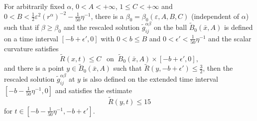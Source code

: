 \begin{lemma}
  \label{lem:cz-low-curvature-point-backward-extension}
For arbitrarily fixed $\alpha$,
$0<A<+\infty$, $1 \leq C<+\infty$ and $0 < B
<\frac{1}{2}\varepsilon^2 (r^{\alpha})^{-2}-
\frac{1}{50}\eta^{-1}$, there is a $\beta_0=\beta_0(\varepsilon,
A,B,C)$ (independent of $\alpha$) such that if $\beta\geq\beta_0$
and the rescaled solution $\widetilde{g}^{\alpha\beta}_{ij}$ on
the ball $\widetilde{B}_{0}(\bar{x},A)$ is defined on a time
interval $[-b+\epsilon',0]$ with $0 < b \leq B$ and $0<\epsilon'
<\frac{1}{50}\eta^{-1}$ and the scalar curvature satisfies
$$
\widetilde{R}(x,t)\leq {C} \ \ \mbox{ on } \
\widetilde{B}_{0}(\bar{x},A)\times [-b+\epsilon',0],
$$
 and there is a point $y\in \widetilde{B}_{0}(\bar{x},A)$ such
that $\widetilde{R}(y,-b+\epsilon')\leq \frac{3}{2}$, then the
rescaled solution $\widetilde{g}^{\alpha\beta}_{ij}$ at $y$ is
also defined on the extended time interval
$[-b-\frac{1}{50}\eta^{-1},0]$ and satisfies the estimate
$$
\widetilde{R}(y,t)\leq 15
$$
for $t\in[-b-\frac{1}{50}\eta^{-1},-b+\epsilon']$.

\end{lemma}

